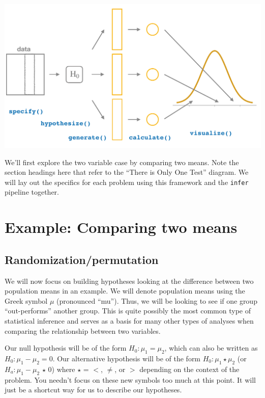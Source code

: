\documentclass[12pt,]{krantz}
\theoremstyle{definition}
\theoremstyle{definition}
\theoremstyle{definition}
\theoremstyle{remark}
\begin{document}
\begin{center}\includegraphics[width=\textwidth]{images/flowcharts/infer/ht} \end{center}

We'll first explore the two variable case by comparing two means. Note
the section headings here that refer to the ``There is Only One Test''
diagram. We will lay out the specifics for each problem using this
framework and the \texttt{infer} pipeline together.

\section{Example: Comparing two
means}\label{example-comparing-two-means}

\subsection{Randomization/permutation}\label{randomizationpermutation}

We will now focus on building hypotheses looking at the difference
between two population means in an example. We will denote population
means using the Greek symbol \(\mu\) (pronounced ``mu''). Thus, we will
be looking to see if one group ``out-performs'' another group. This is
quite possibly the most common type of statistical inference and serves
as a basis for many other types of analyses when comparing the
relationship between two variables.

Our null hypothesis will be of the form \(H_0: \mu_1 = \mu_2\), which
can also be written as \(H_0: \mu_1 - \mu_2 = 0\). Our alternative
hypothesis will be of the form \(H_0: \mu_1 \star \mu_2\) (or
\(H_a: \mu_1 - \mu_2 \, \star \, 0\)) where \(\star\) = \(<\), \(\ne\),
or \(>\) depending on the context of the problem. You needn't focus on
these new symbols too much at this point. It will just be a shortcut way
for us to describe our hypotheses.
\end{document}
